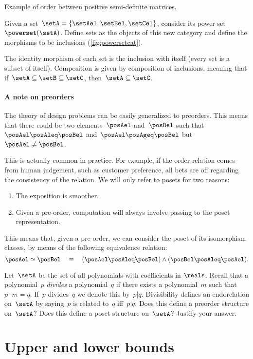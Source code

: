 \begin{marginfigure}
    \begin{center}
\end{center}
    \caption{Example of order between positive semi-definite matrices.}
    \label{fig:posdef_hasse}
\end{marginfigure}

  \begin{example}
    \label{ex:hasseinclusion}
    Given a set~$\setA=\{\setAel,\setBel,\setCel\}$, consider its power set~$\powerset(\setA)$.
    Define sets as the objects of this new category and define the morphisms to be inclusions (\cref{fig:powersetcat}).

    The identity morphism of each set is the inclusion with itself (every set is a subset of itself).
    Composition is given by composition of inclusions, meaning that if~$\setA\subseteq \setB \subseteq \setC$, then~$\setA\subseteq \setC$.
  \end{example}


\paragraph{A note on preorders}
The theory of design problems can be easily generalized to preorders.
This means that there could be two elements~$\posAel$ and~$\posBel$ such that~$\posAel\posAleq \posBel$ and~$\posAel \posAgeq \posBel$ but~$\posAel \neq \posBel$.

This is actually common in practice.
For example, if the order relation comes from human judgement, such as customer preference, all bets are off regarding the consistency of the relation.
We will only refer to posets for two reasons:
\begin{enumerate}
  \item The exposition is smoother.
  \item Given a pre-order, computation will always involve passing to the poset representation.
\end{enumerate}
This means that, given a pre-order, we can consider the poset of its isomorphism classes, by means of the following equivalence relation:
\begin{equation}
  \posAel \simeq \posBel \quad \equiv \quad (\posAel \posAleq \posBel) \wedge (\posBel \posAleq \posAel).
\end{equation}

\begin{gradedexercise}\label{ex:PolynomialDivisibility}
Let~$\setA$ be the set of all polynomials with coefficients in $\reals$.
Recall that a polynomial~$p$ \emph{divides} a polynomial~$q$ if there exists a polynomial~$m$ such that~$p \cdot m = q$.
If~$p$ divides~$q$ we denote this by~$p \vert q$.
Divisibility defines an endorelation on~$\setA$ by saying~$p$ is related to~$q$ iff~$p \vert q$.
Does this define a preorder structure on~$\setA$? Does this define a poset structure on~$\setA$? Justify your answer.
\end{gradedexercise}


\section{Upper and lower bounds}
